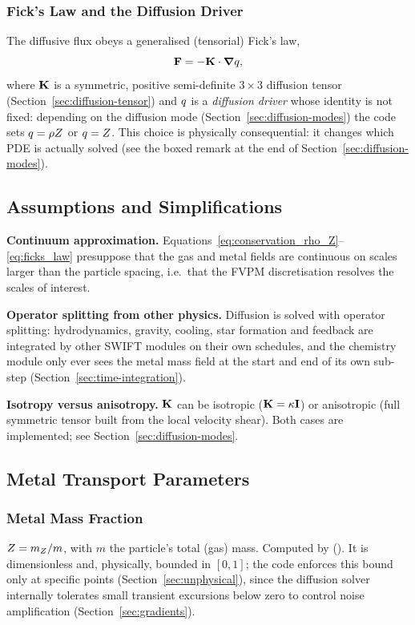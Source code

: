 \subsubsection{Fick's Law and the Diffusion Driver}
\label{sec:ficks-law}
The diffusive flux obeys a generalised (tensorial) Fick's law,
\begin{equation}
  \label{eq:ficks_law}
  \mathbf{F} = -\mathbf{K} \cdot \grad q ,
\end{equation}
where $\mathbf{K}$ is a symmetric, positive semi-definite $3\times3$ diffusion
tensor (Section~\ref{sec:diffusion-tensor}) and $q$ is a
\emph{diffusion driver} whose identity is not fixed: depending on the
diffusion mode (Section~\ref{sec:diffusion-modes}) the code sets
$q = \rho Z$ or $q = Z$. This choice is physically
consequential: it changes which PDE is actually solved (see the boxed remark at the end of
Section~\ref{sec:diffusion-modes}).

\subsection{Assumptions and Simplifications}

\textbf{Continuum approximation.}
Equations~\eqref{eq:conservation_rho_Z}--\eqref{eq:ficks_law} presuppose
that the gas and metal fields are continuous on scales larger than the
particle spacing, i.e.\ that the FVPM discretisation resolves the scales
of interest.

\textbf{Operator splitting from other physics.}
Diffusion is solved with operator splitting: hydrodynamics, gravity,
cooling, star formation and feedback are integrated by other SWIFT
modules on their own schedules, and the chemistry module only ever sees
the metal mass field at the start and end of its own sub-step
(Section~\ref{sec:time-integration}).

\textbf{Isotropy versus anisotropy.}
$\mathbf{K}$ can be isotropic ($\mathbf{K} = \kappa \mathbf I$) or anisotropic
(full symmetric tensor built from the local velocity shear). Both cases
are implemented; see Section~\ref{sec:diffusion-modes}.

\subsection{Metal Transport Parameters}

\subsubsection{Metal Mass Fraction}
$Z = m_Z / m$, with $m$ the particle's total (gas) mass. Computed by
 ().
It is dimensionless and, physically, bounded in $[0,1]$; the code enforces
this bound only at specific points (Section~\ref{sec:unphysical}), since
the diffusion solver internally tolerates small transient excursions
below zero to control noise amplification (Section~\ref{sec:gradients}).

